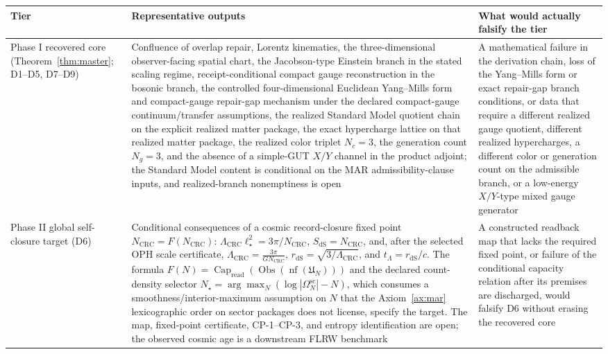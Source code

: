 \documentclass[11pt]{article}
\begin{document}
\begingroup
\footnotesize
\begin{longtable}{@{}>{\raggedright\arraybackslash}p{}>{\raggedright\arraybackslash}p{}>{\raggedright\arraybackslash}p{}@{}}
\toprule
Tier & Representative outputs & What would actually falsify the tier \\
\midrule
\endhead
\bottomrule
\endfoot
Phase I recovered core (Theorem~\ref{thm:master}; D1--D5, D7--D9) & Confluence of overlap repair, Lorentz kinematics, the three-dimensional observer-facing spatial chart, the Jacobson-type Einstein branch in the stated scaling regime, receipt-conditional compact gauge reconstruction in the bosonic branch, the controlled four-dimensional Euclidean Yang--Mills form and compact-gauge repair-gap mechanism under the declared compact-gauge continuum/transfer assumptions, the realized Standard Model quotient chain on the explicit realized matter package, the exact hypercharge lattice on that realized matter package, the realized color triplet \(N_c=3\), the generation count \(N_g=3\), and the absence of a simple-GUT \(X/Y\) channel in the product adjoint; the Standard Model content is conditional on the MAR admissibility-clause inputs, and realized-branch nonemptiness is open & A mathematical failure in the derivation chain, loss of the Yang--Mills form or exact repair-gap branch conditions, or data that require a different realized gauge quotient, different realized hypercharges, a different color or generation count on the admissible branch, or a low-energy \(X/Y\)-type mixed gauge generator \\
Phase II global self-closure target (D6) & Conditional consequences of a cosmic record-closure fixed point \(N_{\mathrm{CRC}}=F(N_{\mathrm{CRC}})\): \(\Lambda_{\mathrm{CRC}}\ell_\star^2=3\pi/N_{\mathrm{CRC}}\), \(S_{\mathrm{dS}}=N_{\mathrm{CRC}}\), and, after the selected OPH scale certificate, \(\Lambda_{\mathrm{CRC}}=\frac{3\pi}{G N_{\mathrm{CRC}}}\), \(r_{\mathrm{dS}}=\sqrt{3/\Lambda_{\mathrm{CRC}}}\), and \(t_\Lambda=r_{\mathrm{dS}}/c\). The formula \(F(N)=\operatorname{Cap}_{\mathrm{read}}(\operatorname{Obs}(\operatorname{nf}(\mathfrak U_N)))\) and the declared count-density selector \(N_\star=\arg\max_N(\log|\Omega^{\mathrm{sc}}_N|-N)\), which consumes a smoothness/interior-maximum assumption on \(N\) that the Axiom~\ref{ax:mar} lexicographic order on sector packages does not license, specify the target. The map, fixed-point certificate, CP-1--CP-3, and entropy identification are open; the observed cosmic age is a downstream FLRW benchmark & A constructed readback map that lacks the required fixed point, or failure of the conditional capacity relation after its premises are discharged, would falsify D6 without erasing the recovered core \\

\end{longtable}
\end{document}
